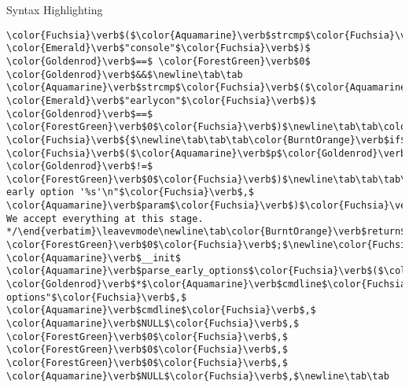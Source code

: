 \begin{frame}{Syntax Highlighting}
\begin{verbatim}
\color{Fuchsia}\verb$($\color{Aquamarine}\verb$strcmp$\color{Fuchsia}\verb$($\color{Aquamarine}\verb$param$\color{Fuchsia}\verb$,$ \color{Emerald}\verb$"console"$\color{Fuchsia}\verb$)$ \color{Goldenrod}\verb$==$ \color{ForestGreen}\verb$0$ \color{Goldenrod}\verb$&&$\newline\tab\tab     \color{Aquamarine}\verb$strcmp$\color{Fuchsia}\verb$($\color{Aquamarine}\verb$p$\color{Goldenrod}\verb$-$\color{Goldenrod}\verb$>$\color{Aquamarine}\verb$str$\color{Fuchsia}\verb$,$ \color{Emerald}\verb$"earlycon"$\color{Fuchsia}\verb$)$ \color{Goldenrod}\verb$==$ \color{ForestGreen}\verb$0$\color{Fuchsia}\verb$)$\newline\tab\tab\color{Fuchsia}\verb$)$ \color{Fuchsia}\verb${$\newline\tab\tab\tab\color{BurntOrange}\verb$if$ \color{Fuchsia}\verb$($\color{Aquamarine}\verb$p$\color{Goldenrod}\verb$-$\color{Goldenrod}\verb$>$\color{Aquamarine}\verb$setup_func$\color{Fuchsia}\verb$($\color{Aquamarine}\verb$val$\color{Fuchsia}\verb$)$ \color{Goldenrod}\verb$!=$ \color{ForestGreen}\verb$0$\color{Fuchsia}\verb$)$\newline\tab\tab\tab\tab\color{Aquamarine}\verb$pr_warn$\color{Fuchsia}\verb$($\color{Emerald}\verb$"Malformed early option '%s'\n"$\color{Fuchsia}\verb$,$ \color{Aquamarine}\verb$param$\color{Fuchsia}\verb$)$\color{Fuchsia}\verb$;$\newline\tab\tab\color{Fuchsia}\verb$}$\newline\tab\color{Fuchsia}\verb$}$\newline\tab\color{Rhodamine}\begin{verbatim}/* We accept everything at this stage. */\end{verbatim}\leavevmode\newline\tab\color{BurntOrange}\verb$return$ \color{ForestGreen}\verb$0$\color{Fuchsia}\verb$;$\newline\color{Fuchsia}\verb$}$\newline\newline\color{BurntOrange}\verb$void$ \color{Aquamarine}\verb$__init$ \color{Aquamarine}\verb$parse_early_options$\color{Fuchsia}\verb$($\color{BurntOrange}\verb$char$ \color{Goldenrod}\verb$*$\color{Aquamarine}\verb$cmdline$\color{Fuchsia}\verb$)$\newline\color{Fuchsia}\verb${$\newline\tab\color{Aquamarine}\verb$parse_args$\color{Fuchsia}\verb$($\color{Emerald}\verb$"early options"$\color{Fuchsia}\verb$,$ \color{Aquamarine}\verb$cmdline$\color{Fuchsia}\verb$,$ \color{Aquamarine}\verb$NULL$\color{Fuchsia}\verb$,$ \color{ForestGreen}\verb$0$\color{Fuchsia}\verb$,$ \color{ForestGreen}\verb$0$\color{Fuchsia}\verb$,$ \color{ForestGreen}\verb$0$\color{Fuchsia}\verb$,$ \color{Aquamarine}\verb$NULL$\color{Fuchsia}\verb$,$\newline\tab\tab   
\end{verbatim}
\end{frame}
